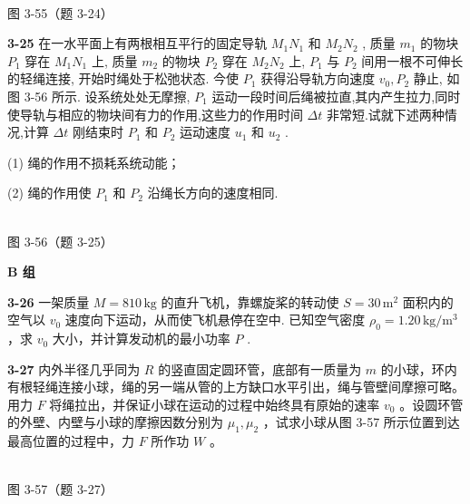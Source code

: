 \begin{center}
\resizebox{0.50\textwidth}{!}{}\\[4pt]
{\small 图 3-55（题 3-24）}
\end{center}

\newpage

\textbf{3-25} 在一水平面上有两根相互平行的固定导轨 $M_{1}N_{1}$ 和 $M_{2}N_{2}$ , 质量 $m_{1}$ 的物块 $P_{1}$ 穿在 $M_{1}N_{1}$ 上, 质量 $m_{2}$ 的物块 $P_{2}$ 穿在 $M_{2}N_{2}$ 上, $P_{1}$ 与 $P_{2}$ 间用一根不可伸长的轻绳连接, 开始时绳处于松弛状态. 今使 $P_{1}$ 获得沿导轨方向速度 $v_{0}, P_{2}$ 静止, 如图 3-56 所示. 设系统处处无摩擦, $P_{1}$ 运动一段时间后绳被拉直,其内产生拉力,同时使导轨与相应的物块间有力的作用,这些力的作用时间 $\Delta t$ 非常短.试就下述两种情况,计算 $\Delta t$ 刚结束时 $P_{1}$ 和 $P_{2}$ 运动速度 $u_{1}$ 和 $u_{2}$ .

(1) 绳的作用不损耗系统动能；

(2) 绳的作用使 $P_{1}$ 和 $P_{2}$ 沿绳长方向的速度相同.

\begin{center}
\resizebox{0.50\textwidth}{!}{}\\[4pt]
{\small 图 3-56（题 3-25）}
\end{center}

\newpage

\begin{center}\textbf{B 组}\end{center}

\textbf{3-26} 一架质量 $M = 810\,\mathrm{kg}$ 的直升飞机，靠螺旋桨的转动使 $S = 30\,\mathrm{m}^{2}$ 面积内的空气以 $v_{0}$ 速度向下运动，从而使飞机悬停在空中. 已知空气密度 $\rho_0 = 1.20\,\mathrm{kg/m^3}$ ，求 $v_{0}$ 大小，并计算发动机的最小功率 $P$ .

\newpage

\textbf{3-27} 内外半径几乎同为 $R$ 的竖直固定圆环管，底部有一质量为 $m$ 的小球，环内有根轻绳连接小球，绳的另一端从管的上方缺口水平引出，绳与管壁间摩擦可略。用力 $F$ 将绳拉出，并保证小球在运动的过程中始终具有原始的速率 $v_{0}$ 。设圆环管的外壁、内壁与小球的摩擦因数分别为 $\mu_{1}, \mu_{2}$ ，试求小球从图 3-57 所示位置到达最高位置的过程中，力 $F$ 所作功 $W$ 。

\begin{center}
\resizebox{0.42\textwidth}{!}{}\\[4pt]
{\small 图 3-57（题 3-27）}
\end{center}

